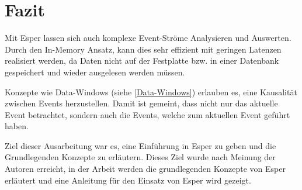 \chapter{Fazit}
Mit Esper lassen sich auch komplexe Event-Ströme Analysieren und Auswerten. Durch den In-Memory Ansatz, kann dies sehr effizient mit geringen Latenzen realisiert werden,
da Daten nicht auf der Festplatte bzw. in einer Datenbank gespeichert und wieder ausgelesen werden müssen.

Konzepte wie Data-Windows (siehe \ref{Data-Windows}) erlauben es, eine Kausalität zwischen Events herzustellen.
Damit ist gemeint, dass nicht nur das aktuelle Event betrachtet, sondern auch die Events, welche zum aktuellen Event geführt haben.

Ziel dieser Ausarbeitung war es, eine Einführung in Esper zu geben und die Grundlegenden Konzepte zu erläutern. Dieses Ziel wurde nach Meinung der Autoren erreicht, in der Arbeit werden die grundlegenden Konzepte von Esper erläutert und eine Anleitung für den Einsatz von Esper wird gezeigt.